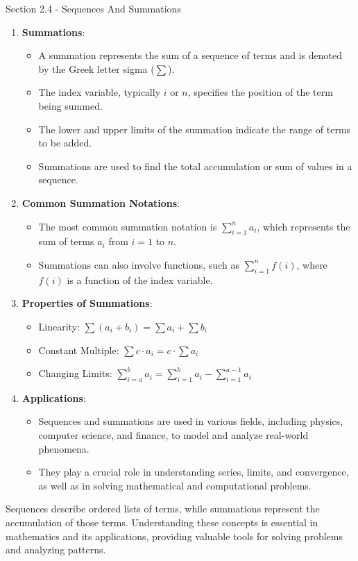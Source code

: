 \begin{notes}{Section 2.4 - Sequences And Summations}
\begin{enumerate}[label=\arabic*.]
        \item \textbf{Summations}:
        \begin{itemize}
            \item A summation represents the sum of a sequence of terms and is denoted by the Greek letter sigma ($\sum$).
            \item The index variable, typically $i$ or $n$, specifies the position of the term being summed.
            \item The lower and upper limits of the summation indicate the range of terms to be added.
            \item Summations are used to find the total accumulation or sum of values in a sequence.
        \end{itemize}
        
        \item \textbf{Common Summation Notations}:
        \begin{itemize}
            \item The most common summation notation is $\sum_{i=1}^{n} a_i$, which represents the sum of terms $a_i$ from $i = 1$ to $n$.
            \item Summations can also involve functions, such as $\sum_{i=1}^{n} f(i)$, where $f(i)$ is a function of the index variable.
        \end{itemize}
        
        \item \textbf{Properties of Summations}:
        \begin{itemize}
            \item Linearity: $\sum (a_i + b_i) = \sum a_i + \sum b_i$
            \item Constant Multiple: $\sum c \cdot a_i = c \cdot \sum a_i$
            \item Changing Limits: $\sum_{i=a}^{b} a_i = \sum_{i=1}^{b} a_i - \sum_{i=1}^{a-1} a_i$
        \end{itemize}
        
        \item \textbf{Applications}:
        \begin{itemize}
            \item Sequences and summations are used in various fields, including physics, computer science, and finance, to model and analyze real-world phenomena.
            \item They play a crucial role in understanding series, limits, and convergence, as well as in solving mathematical and computational problems.
        \end{itemize}
    \end{enumerate}
    
    Sequences describe ordered lists of terms, while summations represent the accumulation of those terms. Understanding these concepts is essential in mathematics and its applications, providing 
    valuable tools for solving problems and analyzing patterns.
\end{notes}

